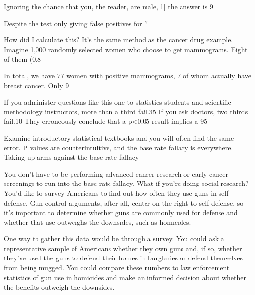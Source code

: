 Ignoring the chance that you, the reader, are male,[1] the answer is 9%

Despite the test only giving false positives for 7%

How did I calculate this? It’s the same method as the cancer drug example. Imagine 1,000 randomly selected women who choose to get mammograms. Eight of them (0.8%

In total, we have 77 women with positive mammograms, 7 of whom actually have breast cancer. Only 9%

If you administer questions like this one to statistics students and scientific methodology instructors, more than a third fail.35 If you ask doctors, two thirds fail.10 They erroneously conclude that a p<0.05 result implies a 95%

Examine introductory statistical textbooks and you will often find the same error. P values are counterintuitive, and the base rate fallacy is everywhere.
Taking up arms against the base rate fallacy

You don’t have to be performing advanced cancer research or early cancer screenings to run into the base rate fallacy. What if you’re doing social research? You’d like to survey Americans to find out how often they use guns in self-defense. Gun control arguments, after all, center on the right to self-defense, so it’s important to determine whether guns are commonly used for defense and whether that use outweighs the downsides, such as homicides.

One way to gather this data would be through a survey. You could ask a representative sample of Americans whether they own guns and, if so, whether they’ve used the guns to defend their homes in burglaries or defend themselves from being mugged. You could compare these numbers to law enforcement statistics of gun use in homicides and make an informed decision about whether the benefits outweigh the downsides.

